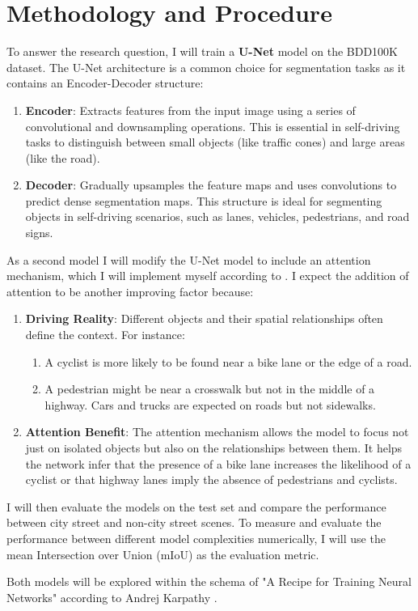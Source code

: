 \section{Methodology and Procedure}
To answer the research question, I will train a \textbf{U-Net} model on the BDD100K dataset. The U-Net architecture is a common choice for segmentation tasks as it contains an Encoder-Decoder structure:
\begin{enumerate}
    \item \textbf{Encoder}: Extracts features from the input image using a series of convolutional and downsampling operations. This is essential in self-driving tasks to distinguish between small objects (like traffic cones) and large areas (like the road).
    \item \textbf{Decoder}: Gradually upsamples the feature maps and uses convolutions to predict dense segmentation maps. This structure is ideal for segmenting objects in self-driving scenarios, such as lanes, vehicles, pedestrians, and road signs.
\end{enumerate}

As a second model I will modify the U-Net model to include an attention mechanism, which I will implement myself according to \cite{oktayAttentionUNetLearning2018}. I expect the addition of attention to be another improving factor because:
\begin{enumerate}
    \item \textbf{Driving Reality}: Different objects and their spatial relationships often define the context. For instance:
    \begin{enumerate}
        \item  A cyclist is more likely to be found near a bike lane or the edge of a road.
        \item A pedestrian might be near a crosswalk but not in the middle of a highway.
        Cars and trucks are expected on roads but not sidewalks.
    \end{enumerate} 
    \item \textbf{Attention Benefit}: The attention mechanism allows the model to focus not just on isolated objects but also on the relationships between them. It helps the network infer that the presence of a bike lane increases the likelihood of a cyclist or that highway lanes imply the absence of pedestrians and cyclists.
\end{enumerate}

I will then evaluate the models on the test set and compare the performance between city street and non-city street scenes. To measure and evaluate the performance between different model complexities numerically, I will use the mean Intersection over Union (mIoU) as the evaluation metric.

Both models will be explored within the schema of "A Recipe for Training Neural Networks" according to Andrej Karpathy \cite{karpathyRecipeTrainingNeural2019}.